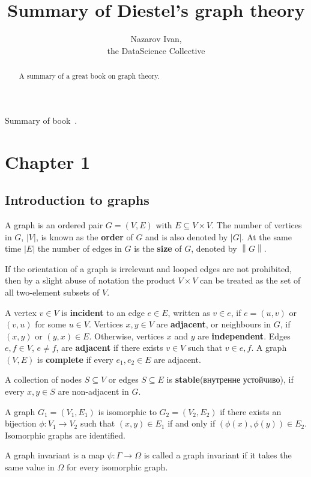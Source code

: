 \documentclass[a4paper]{article}
\title{Summary of Diestel's graph theory}
\author{Nazarov Ivan, \rus{101мНОД(ИССА)}\\the DataScience Collective}
\newcommand{\abs}[1]{{\left | #1 \right |}}
\newcommand{\nrm}[1]{{\left\| #1 \right \|}}
\newcommand{\rus}[1]{\foreignlanguage{russian}{#1}}
\begin{document}
\maketitle

\begin{abstract}
	A summary of a great book on graph theory.
\end{abstract}

\tableofcontents
\clearpage

Summary of book~\cite{diestel2006}.

\section{Chapter 1} %
\label{sec:chapter_1}

\subsection{Introduction to graphs} %
\label{sub:introduction_to_graphs}

A graph is an ordered pair $G=(V,E)$ with $E\subseteq V\times V$.
The number of vertices in $G$, $\abs{V}$, is known as the \textbf{order} of $G$ and is also denoted by $\abs{G}$.
At the same time $\abs{E}$ the number of edges in $G$ is the \textbf{size} of $G$, denoted by $\nrm{G}$.

If the orientation of a graph is irrelevant and looped edges are not prohibited,
then by a slight abuse of notation the product $V\times V$ can be treated as the set of all two-element subsets of $V$.

A vertex $v\in V$ is \textbf{incident} to an edge $e\in E$, written as $v\in e$, if $e=(u,v)$ or $(v,u)$ for some $u\in V$.
Vertices $x,y\in V$ are \textbf{adjacent}, or neighbours in $G$, if $(x,y)$ or $(y,x)\in E$. Otherwise, vertices $x$ and $y$ are \textbf{independent}.
Edges $e,f\in V$, $e\neq f$, are \textbf{adjacent} if there exists $v\in V$ such that $v\in e,f$.
A graph $(V,E)$ is \textbf{complete} if every $e_1, e_2\in E$ are adjacent.

A collection of nodes $S\subseteq V$ or edges $S\subseteq E$ is \textbf{stable}(\rus{внутренне устойчиво}), if every $x,y\in S$ are non-adjacent in $G$.

A graph $G_1 = (V_1,E_1)$ is isomorphic to $G_2=(V_2,E_2)$ if there exists an bijection $\phi:V_1\to V_2$ such that $(x,y)\in E_1$ if and only if $(\phi(x),\phi(y))\in E_2$.
Isomorphic graphs are identified.

A graph invariant is a map $\psi:\Gamma\to\Omega$ is called a graph invariant if it takes the same value in $\Omega$ for every isomorphic graph.
\end{document}
